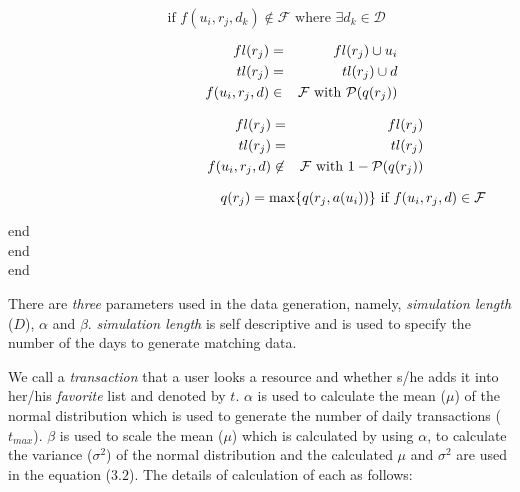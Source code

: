 \documentclass[12pt,a4paper]{report}
\begin{document}
	\begin{equation}
	\hspace{1cm}\text{if } f(u_{i}, r_{j}, d_{k}) \not \in \mathcal{F} \text{ where }\exists d_{k} \in \mathcal{D}
	\end{equation}

	\begin{eqnarray}	
	\hspace{2.8cm}fl(r_{j}) & = &fl(r_{j}) \cup u_{i} \nonumber \\
	tl(r_{j}) &=& tl(r_{j}) \cup d \nonumber \\
           f(u_{i}, r_{j}, d) &\in &\mathcal{F} \text{ with } \mathcal{P}(q(r_{j}))		
	\end{eqnarray}

	\begin{eqnarray}	
	\hspace{3.5cm}fl(r_{j}) &= &fl(r_{j}) \nonumber \\
	tl(r_{j}) & = &  tl(r_{j}) \nonumber \\
           f(u_{i}, r_{j}, d) &\not \in &\mathcal{F} \text{ with } 1-\mathcal{P}(q(r_{j}))		
	\end{eqnarray}

	\begin{equation}	
	\hspace{4.7cm}q(r_{j})= \max \{q(r_{j}, a(u_{i})) \} \text{ if }{ f(u_{i}, r_{j}, d) \in \mathcal{F}}  
	\end{equation}

	\hspace{3.2cm}end\\

	\hspace{2.4cm}end\\

	\hspace{1.6cm}end\\

	\clearpage
	
	\normalsize
	There are \emph{three} parameters used in the data generation, namely, \emph{simulation length} ($D$),  $\alpha$ and $\beta$. \emph{simulation length} is self descriptive and is used to specify the number of the days to generate matching data.  \par
	We call a \emph{transaction} that a user looks a resource and whether s/he adds it into her/his \emph{favorite} list and denoted by $t$. $\alpha$ is used to calculate the mean ($\mu$) of the normal distribution which is used to generate the number of daily transactions ($t_{max}$). $\beta$ is used to scale the mean ($\mu$) which is calculated by using $\alpha$, to calculate the variance ($\sigma^2$) of the normal distribution and the calculated $\mu$ and $\sigma^2$ are used in the equation ($3.2$). The details of calculation of each as follows: \\
\end{document}
